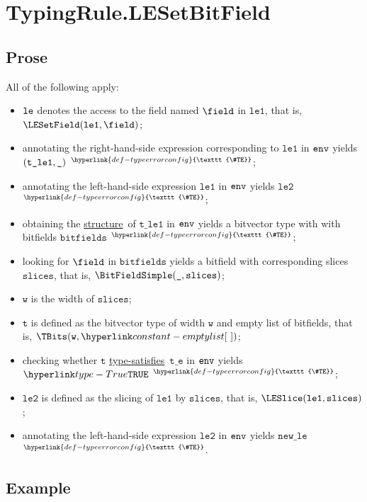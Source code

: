 \documentclass{book}
\newcommand\TypeErrorConfig[0]{\hyperlink{def-typeerrorconfig}{\texttt{\#TE}}}
\newcommand\ProseOrTypeError[0]{\hyperlink{def-proseortypeerror}{$^{\TypeErrorConfig}$}}
\newcommand\structure[0]{\hyperlink{def-structure}{structure}}
\newcommand\typesatisfies[0]{\hyperlink{def-typesatisfies}{type-satisfies}}
\newcommand\vt[0]{\texttt{t}}
\newcommand\vte[0]{\texttt{t\_e}}
\newcommand\vleone[0]{\texttt{le1}}
\newcommand\vletwo[0]{\texttt{le2}}
\newcommand\vtleone[0]{\texttt{t\_le1}}
\newcommand\vw[0]{\texttt{w}}
\newcommand\bitfields[0]{\texttt{bitfields}}
\newcommand\newle[0]{\texttt{new\_le}}
\newcommand\slices[0]{\texttt{slices}}
\begin{document}

\section{TypingRule.LESetBitField \label{sec:TypingRule.LESetBitField}}

\subsection{Prose}
All of the following apply:
\begin{itemize}
\item $\texttt{le}$ denotes the access to the field named $\field$ in $\vleone$, that is, \\ $\LESetField(\vleone, \field)$;
\item annotating the right-hand-side expression corresponding to $\vleone$ in $\texttt{env}$ yields \\ $(\vtleone, \Ignore)$ \ProseOrTypeError;
\item annotating the left-hand-side expression $\vleone$ in $\texttt{env}$ yields $\vletwo$ \ProseOrTypeError;
\item obtaining the \structure\ of $\vtleone$ in $\texttt{env}$ yields a bitvector type with with bitfields $\bitfields$ \ProseOrTypeError;
\item looking for $\field$ in $\bitfields$ yields a bitfield with corresponding slices $\slices$, that is, $\BitFieldSimple(\Ignore, \slices)$;
\item $\vw$ is the width of $\slices$;
\item $\vt$ is defined as the bitvector type of width $\vw$ and empty list of bitfields, that is, $\TBits(\vw, \emptylist)$;
\item checking whether $\vt$ \typesatisfies\ $\vte$ in $\texttt{env}$ yields $\True$ \ProseOrTypeError;
\item $\vletwo$ is defined as the slicing of $\vleone$ by $\slices$, that is, $\LESlice(\vleone, \slices)$;
\item annotating the left-hand-side expression $\vletwo$ in $\texttt{env}$ yields $\newle$ \ProseOrTypeError.
\end{itemize}

\subsection{Example}
\end{document}
